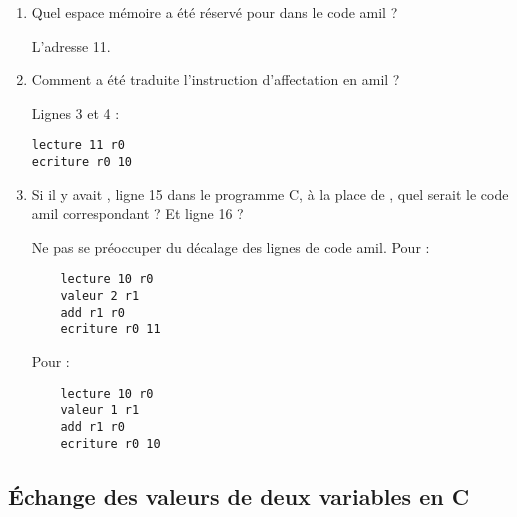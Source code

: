 \begin{enumerate}
\item Quel espace mémoire a été réservé pour  dans le code amil ?
  \begin{correction}
L'adresse 11.
  \end{correction}
\item Comment a été traduite l'instruction d'affectation  en amil ?
  \begin{correction}
Lignes 3 et 4 :
\begin{verbatim}
lecture 11 r0
ecriture r0 10
\end{verbatim}
  \end{correction}
\item Si il y avait , ligne 15 dans le programme C, à la
  place de , quel serait le code amil correspondant ? Et  ligne 16 ?
  \begin{correction}
Ne pas se préoccuper du décalage des lignes de code amil. Pour  :
\begin{verbatim}
    lecture 10 r0
    valeur 2 r1
    add r1 r0
    ecriture r0 11
\end{verbatim}
Pour  :
\begin{verbatim}
    lecture 10 r0
    valeur 1 r1
    add r1 r0
    ecriture r0 10
\end{verbatim}

  \end{correction}
\end{enumerate}


\subsection{Échange des valeurs de deux variables en C}

